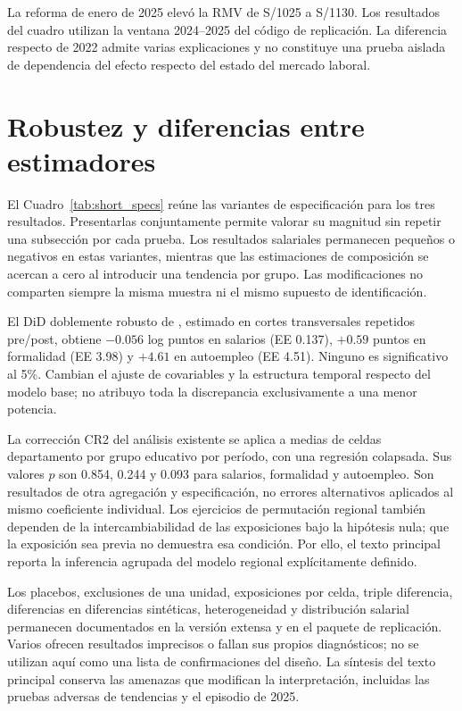 La reforma de enero de 2025 elevó la RMV de S/1025 a S/1130. Los resultados del cuadro utilizan la ventana 2024--2025 del código de replicación. La diferencia respecto de 2022 admite varias explicaciones y no constituye una prueba aislada de dependencia del efecto respecto del estado del mercado laboral.
\FloatBarrier

\section{Robustez y diferencias entre estimadores}
\label{app:short_robustness}

El Cuadro~\ref{tab:short_specs} reúne las variantes de especificación para los tres resultados. Presentarlas conjuntamente permite valorar su magnitud sin repetir una subsección por cada prueba. Los resultados salariales permanecen pequeños o negativos en estas variantes, mientras que las estimaciones de composición se acercan a cero al introducir una tendencia por grupo. Las modificaciones no comparten siempre la misma muestra ni el mismo supuesto de identificación.



El DiD doblemente robusto de \citet{santanna_zhao_2020}, estimado en cortes transversales repetidos pre/post, obtiene $-0.056$ log puntos en salarios (EE 0.137), $+0.59$ puntos en formalidad (EE 3.98) y $+4.61$ en autoempleo (EE 4.51). Ninguno es significativo al 5\%. Cambian el ajuste de covariables y la estructura temporal respecto del modelo base; no atribuyo toda la discrepancia exclusivamente a una menor potencia.

La corrección CR2 del análisis existente se aplica a medias de celdas departamento por grupo educativo por período, con una regresión colapsada. Sus valores $p$ son 0.854, 0.244 y 0.093 para salarios, formalidad y autoempleo. Son resultados de otra agregación y especificación, no errores alternativos aplicados al mismo coeficiente individual. Los ejercicios de permutación regional también dependen de la intercambiabilidad de las exposiciones bajo la hipótesis nula; que la exposición sea previa no demuestra esa condición. Por ello, el texto principal reporta la inferencia agrupada del modelo regional explícitamente definido.

Los placebos, exclusiones de una unidad, exposiciones por celda, triple diferencia, diferencias en diferencias sintéticas, heterogeneidad y distribución salarial permanecen documentados en la versión extensa y en el paquete de replicación. Varios ofrecen resultados imprecisos o fallan sus propios diagnósticos; no se utilizan aquí como una lista de confirmaciones del diseño. La síntesis del texto principal conserva las amenazas que modifican la interpretación, incluidas las pruebas adversas de tendencias y el episodio de 2025.
\FloatBarrier

